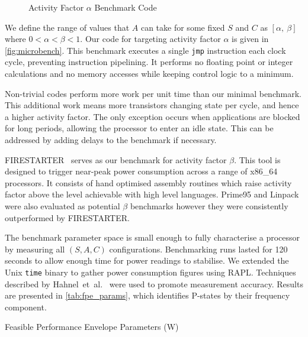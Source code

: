 \begin{figure}[ht]
\centering
\lstset{basicstyle=\ttfamily\footnotesize\bfseries, frame=tb} %

\caption{Activity Factor $\alpha$ Benchmark Code}
\label{fig:microbench}
\end{figure}

We define the range of values that $A$ can take for some fixed $S$ and $C$ as $[\alpha,~\beta]$ where $0 < \alpha < \beta < 1$.
Our code for targeting activity factor $\alpha$ is given in \autoref{fig:microbench}.
This benchmark executes a single \texttt{jmp} instruction each clock cycle, preventing instruction pipelining.
It performs no floating point or integer calculations and no memory accesses while keeping control logic to a minimum.

Non-trivial codes perform more work per unit time than our minimal benchmark.
This additional work means more transistors changing state per cycle, and hence a higher activity factor.
The only exception occurs when applications are blocked for long periods, allowing the processor to enter an idle state.
This can be addressed by adding delays to the benchmark if necessary.

FIRESTARTER~\cite{hackenberg:2013ab} serves as our benchmark for activity factor $\beta$.
This tool is designed to trigger near-peak power consumption across a range of x86\_64 processors.
It consists of hand optimised assembly routines which raise activity factor above the level achievable with high level languages.
Prime95 and Linpack were also evaluated as potential $\beta$ benchmarks however they were consistently outperformed by FIRESTARTER.

The benchmark parameter space is small enough to fully characterise a processor by measuring all $(S,A,C)$ configurations.
Benchmarking runs lasted for 120 seconds to allow enough time for power readings to stabilise.
We extended the Unix \texttt{time} binary to gather power consumption figures using RAPL.
Techniques described by Hahnel~et~al.~\cite{hahnel:2012aa} were used to promote measurement accuracy.
Results are presented in \autoref{tab:fpe_params}, which identifies P-states by their frequency component.

\begin{table}
  \scriptsize
  \centering
  \caption{Feasible Performance Envelope Parameters (W)}
  \label{tab:fpe_params}
  
\end{table}

